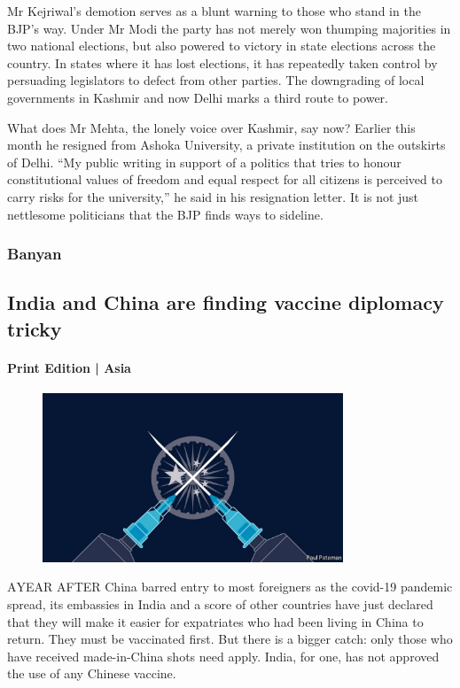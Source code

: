 \documentclass{article}
\begin{document}
Mr Kejriwal's demotion serves as a blunt warning to those who stand in the BJP's way. Under Mr Modi the party has not merely won thumping majorities in two national elections, but also powered to victory in state elections across the country. In states where it has lost elections, it has repeatedly taken control by persuading legislators to defect from other parties. The downgrading of local governments in Kashmir and now Delhi marks a third route to power. 

What does Mr Mehta, the lonely voice over Kashmir, say now? Earlier this month he resigned from Ashoka University, a private institution on the outskirts of Delhi. ``My public writing in support of a politics that tries to honour constitutional values of freedom and equal respect for all citizens is perceived to carry risks for the university,'' he said in his resignation letter. It is not just nettlesome politicians that the BJP finds ways to sideline. {} 
\clearpage
\subsubsection{Banyan }
\subsection{India and China are finding vaccine diplomacy tricky }
\paragraph{Print Edition | Asia  \quad \color{gray}{Mar 27th 2021 }}
\begin{figure}[h]
\centering
\includegraphics[width=0.8\textwidth]{images/20210327_ASD001_0.jpg}
\end{figure}
\lettrine{A} YEAR AFTER China barred entry to most foreigners as the covid-19 pandemic spread, its embassies in India and a score of other countries have just declared that they will make it easier for expatriates who had been living in China to return. They must be vaccinated first. But there is a bigger catch: only those who have received made-in-China shots need apply. India, for one, has not approved the use of any Chinese vaccine. 
\end{document}
